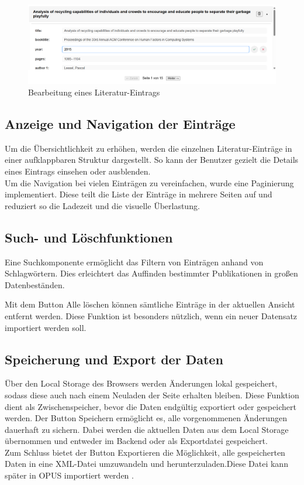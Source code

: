 \begin{figure}[h]
    \centering
    \includegraphics[width=1.0\textwidth]{Graphics/bearbeitung.png}
    \caption{Bearbeitung eines Literatur-Eintrags}
    \label{fig:bearbeiten}
\end{figure}

\subsection{Anzeige und Navigation der Einträge}
Um die Übersichtlichkeit zu erhöhen, werden die einzelnen Literatur-Einträge in einer aufklappbaren
Struktur dargestellt. So kann der Benutzer gezielt die Details eines Eintrags einsehen oder ausblenden.\\

\noindent Um die Navigation bei vielen Einträgen zu vereinfachen, wurde eine Paginierung implementiert.
Diese teilt die Liste der Einträge in mehrere Seiten auf und reduziert so die Ladezeit und die visuelle Überlastung.

\subsection{Such- und Löschfunktionen}
Eine Suchkomponente ermöglicht das Filtern von Einträgen anhand von Schlagwörtern.
Dies erleichtert das Auffinden bestimmter Publikationen in großen Datenbeständen.

\noindent Mit dem Button \glqq Alle löschen\grqq{} können sämtliche Einträge in der aktuellen Ansicht entfernt werden.
Diese Funktion ist besonders nützlich, wenn ein neuer Datensatz importiert werden soll.

\subsection{Speicherung und Export der Daten}
Über den Local Storage des Browsers werden Änderungen lokal gespeichert,
sodass diese auch nach einem Neuladen der Seite erhalten bleiben.
Diese Funktion dient als Zwischenspeicher, bevor die Daten endgültig exportiert oder gespeichert werden.
Der Button \glqq Speichern\grqq{} ermöglicht es, alle vorgenommenen Änderungen dauerhaft zu sichern.
Dabei werden die aktuellen Daten aus dem Local Storage übernommen und entweder im Backend oder als Exportdatei gespeichert.\\

\noindent Zum Schluss  bietet der Button \glqq Exportieren\grqq{} die Möglichkeit,
alle gespeicherten Daten in eine XML-Datei umzuwandeln und herunterzuladen.Diese Datei kann später in OPUS importiert werden .
